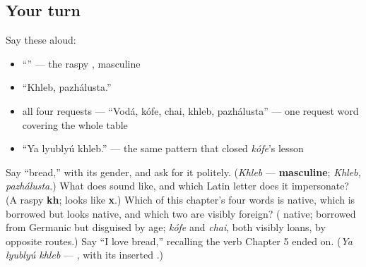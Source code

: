 \subsection*{Your turn}
Say these aloud:

\begin{itemize}
\raggedright
  \item \textquotedblleft{}\textquotedblright{} — the raspy , masculine
  \item \textquotedblleft{}Khleb, pazhálusta.\textquotedblright{}
  \item all four requests — \textquotedblleft{}Vodá, kófe, chai, khleb, pazhálusta\textquotedblright{} — one request word covering the whole table
  \item \textquotedblleft{}Ya lyublyú khleb.\textquotedblright{} — the same pattern that closed \emph{kófe}'s lesson
\end{itemize}

\begin{tcolorbox}[breakable,colback=teal!4,colframe=teal!35!black,title={Before you move on}]
Say \textquotedblleft{}bread,\textquotedblright{} with its gender, and ask for it politely. (\emph{Khleb} — \textbf{masculine}; \emph{Khleb, pazhálusta}.) What does \textbf{} sound like, and which Latin letter does it impersonate? (A raspy \textbf{kh}; looks like \textbf{x}.) Which of this chapter's four words is native, which is borrowed but looks native, and which two are visibly foreign? (\textbf{} native; \textbf{} borrowed from Germanic but disguised by age; \emph{kófe} and \emph{chai}, both visibly loans, by opposite routes.) Say \textquotedblleft{}I love bread,\textquotedblright{} recalling the verb Chapter 5 ended on. (\emph{Ya lyublyú khleb} — \emph{}, with its inserted \textbf{}.)
\end{tcolorbox}

